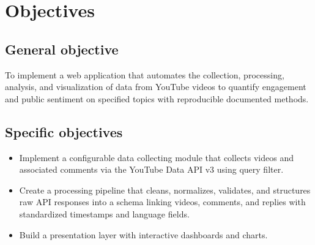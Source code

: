 \section{Objectives}

\subsection{General objective}

To implement a web application that automates the collection, processing, analysis, and visualization of data from YouTube videos to quantify engagement and public sentiment on specified topics with reproducible documented methods.

\subsection{Specific objectives}

\begin{itemize}
	\item Implement a configurable data collecting module that collects videos and associated comments via the YouTube Data API v3 using query filter. %

	\item Create a processing pipeline that cleans, normalizes, validates, and structures raw API responses into a schema linking videos, comments, and replies with standardized timestamps and language fields.

	\item Build a presentation layer with interactive dashboards and charts.

\end{itemize}
